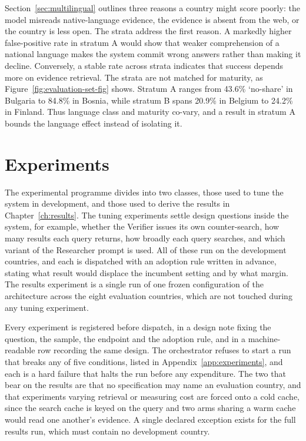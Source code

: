 Section~\ref{sec:multilingual} outlines three reasons a country might score poorly: the model misreads native-language evidence, the evidence is absent from the web, or the country is less open. The strata address the first reason. A markedly higher false-positive rate in stratum A would show that weaker comprehension of a national language makes the system commit wrong answers rather than making it decline. Conversely, a stable rate across strata indicates that success depends more on evidence retrieval. The strata are not matched for maturity, as Figure~\ref{fig:evaluation-set-fig} shows. Stratum A ranges from 43.6\% `no-share' in Bulgaria to 84.8\% in Bosnia, while stratum B spans 20.9\% in Belgium to 24.2\% in Finland. Thus language class and maturity co-vary, and a result in stratum A bounds the language effect instead of isolating it.

\section{Experiments}\label{sec:experiments}

The experimental programme divides into two classes, those used to tune the system in development, and those used to derive the results in Chapter~\ref{ch:results}. The tuning experiments settle design questions inside the system, for example, whether the Verifier issues its own counter-search, how many results each query returns, how broadly each query searches, and which variant of the Researcher prompt is used. All of these run on the development countries, and each is dispatched with an adoption rule written in advance, stating what result would displace the incumbent setting and by what margin. The results experiment is a single run of one frozen configuration of the architecture across the eight evaluation countries, which are not touched during any tuning experiment.

Every experiment is registered before dispatch, in a design note fixing the question, the sample, the endpoint and the adoption rule, and in a machine-readable row recording the same design. The orchestrator refuses to start a run that breaks any of five conditions, listed in Appendix~\ref{app:experiments}, and each is a hard failure that halts the run before any expenditure. The two that bear on the results are that no specification may name an evaluation country, and that experiments varying retrieval or measuring cost are forced onto a cold cache, since the search cache is keyed on the query and two arms sharing a warm cache would read one another's evidence. A single declared exception exists for the full results run, which must contain no development country.

